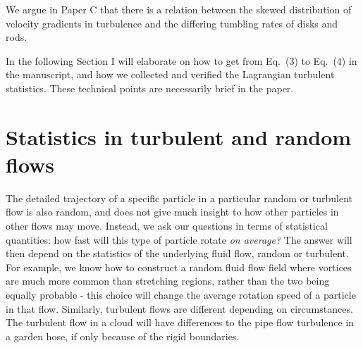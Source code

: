 \documentclass[thesis.tex]{subfiles}
\begin{document}
We argue in Paper C that there is a relation between the skewed distribution of velocity gradients in turbulence and the differing tumbling rates of disks and rods.


In the following Section I will elaborate on how to get from Eq.~(3) to Eq.~(4) in the manuscript, and how we collected and verified the Lagrangian turbulent statistics. These technical points are necessarily brief in the paper.

\section{Statistics in turbulent and random flows}

The detailed trajectory of a specific particle in a particular random or turbulent flow is also random, and does not give much insight to how other particles in other flows may move. Instead, we ask our questions in terms of statistical quantities: how fast will this type of particle rotate \emph{on average?} The answer will then depend on the statistics of the underlying fluid flow, random or turbulent. For example, we know how to construct a random fluid flow field where vortices are much more common than stretching regions, rather than the two being equally probable - this choice will change the average rotation speed of a particle in that flow. Similarly, turbulent flows are different depending on circumstances. The turbulent flow in a cloud will have differences to the pipe flow turbulence in a garden hose, if only because of the rigid boundaries.
\end{document}
